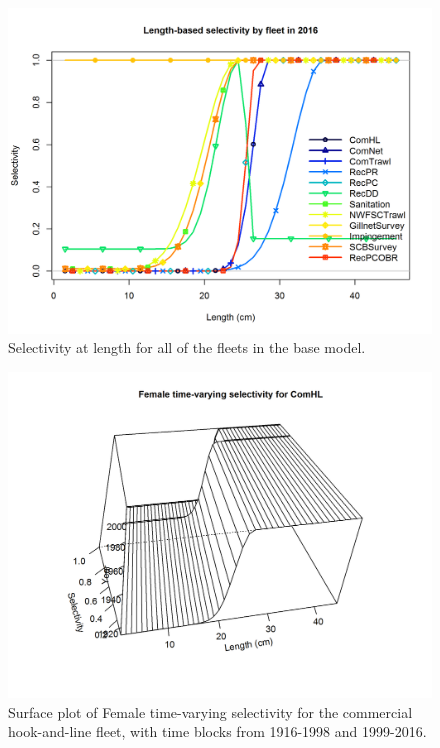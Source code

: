 \documentclass[12pt,]{article}
\begin{document}
\FloatBarrier

\FloatBarrier

\FloatBarrier

\begin{figure}[htbp]
\centering
\includegraphics{r4ss/plots_mod1/sel01_multiple_fleets_length1.png}
\caption{Selectivity at length for all of the fleets in the base model.
\label{fig:sel01_multiple_fleets_length1}}
\end{figure}

\begin{figure}[htbp]
\centering
\includegraphics{r4ss/plots_mod1/sel03_len_timevary_surf_flt1sex1.png}
\caption{Surface plot of Female time-varying selectivity for the
commercial hook-and-line fleet, with time blocks from 1916-1998 and
1999-2016. \label{fig:sel03_len_timevary_surf_flt1sex1}}
\end{figure}
\end{document}
